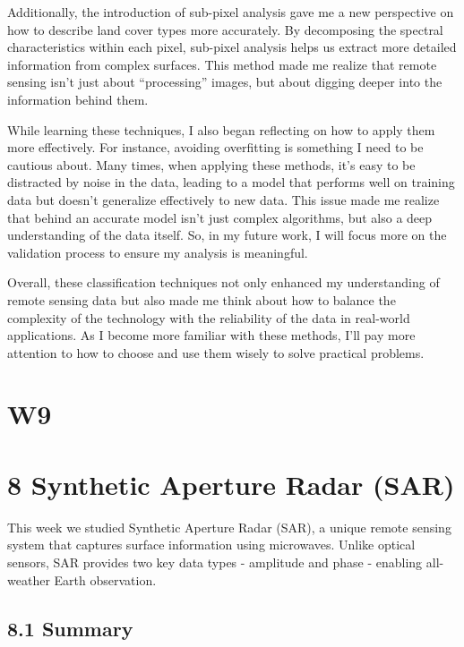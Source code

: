 \documentclass[
  letterpaper,
  DIV=11,
  numbers=noendperiod]{scrreprt}
\begin{document}
Additionally, the introduction of sub-pixel analysis gave me a new
perspective on how to describe land cover types more accurately. By
decomposing the spectral characteristics within each pixel, sub-pixel
analysis helps us extract more detailed information from complex
surfaces. This method made me realize that remote sensing isn't just
about ``processing'' images, but about digging deeper into the
information behind them.

While learning these techniques, I also began reflecting on how to apply
them more effectively. For instance, avoiding overfitting is something I
need to be cautious about. Many times, when applying these methods, it's
easy to be distracted by noise in the data, leading to a model that
performs well on training data but doesn't generalize effectively to new
data. This issue made me realize that behind an accurate model isn't
just complex algorithms, but also a deep understanding of the data
itself. So, in my future work, I will focus more on the validation
process to ensure my analysis is meaningful.

Overall, these classification techniques not only enhanced my
understanding of remote sensing data but also made me think about how to
balance the complexity of the technology with the reliability of the
data in real-world applications. As I become more familiar with these
methods, I'll pay more attention to how to choose and use them wisely to
solve practical problems.


\chapter{W9}\label{w9}


\chapter{8 Synthetic Aperture Radar
(SAR)}\label{synthetic-aperture-radar-sar}

This week we studied Synthetic Aperture Radar (SAR), a unique remote
sensing system that captures surface information using microwaves.
Unlike optical sensors, SAR provides two key data types - amplitude and
phase - enabling all-weather Earth observation.~

\section{8.1 Summary}\label{summary-6}
\end{document}
